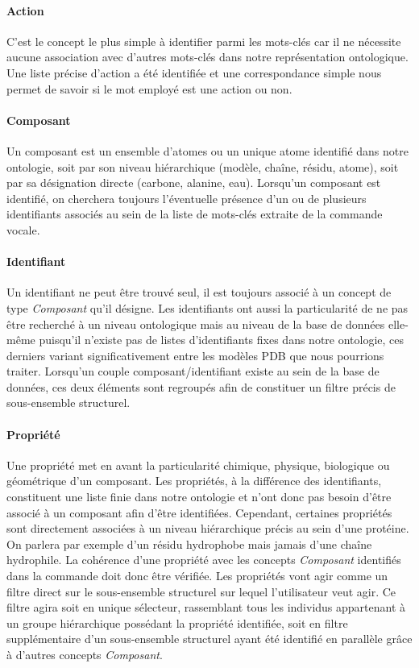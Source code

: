 \paragraph{Action}

C'est le concept le plus simple à identifier parmi les mots-clés car il ne nécessite aucune association avec d'autres mots-clés dans notre représentation ontologique. Une liste précise d'action a été identifiée et une correspondance simple nous permet de savoir si le mot employé est une action ou non.

\paragraph{Composant}

Un composant est un ensemble d'atomes ou un unique atome identifié dans notre ontologie, soit par son niveau hiérarchique (modèle, chaîne, résidu, atome), soit par sa désignation directe (carbone, alanine, eau). Lorsqu'un composant est identifié, on cherchera toujours l'éventuelle présence d'un ou de plusieurs identifiants associés au sein de la liste de mots-clés extraite de la commande vocale.

\paragraph{Identifiant}

Un identifiant ne peut être trouvé seul, il est toujours associé à un concept de type \textit{Composant} qu'il désigne. Les identifiants ont aussi la particularité de ne pas être recherché à un niveau ontologique mais au niveau de la base de données elle-même puisqu'il n'existe pas de listes d'identifiants fixes dans notre ontologie, ces derniers variant significativement entre les modèles PDB que nous pourrions traiter. Lorsqu'un couple composant/identifiant existe au sein de la base de données, ces deux éléments sont regroupés afin de constituer un filtre précis de sous-ensemble structurel.

\paragraph{Propriété}

Une propriété met en avant la particularité chimique, physique, biologique ou géométrique d'un composant. Les propriétés, à la différence des identifiants, constituent une liste finie dans notre ontologie et n'ont donc pas besoin d'être associé à un composant afin d'être identifiées. Cependant, certaines propriétés sont directement associées à un niveau hiérarchique précis au sein d'une protéine. On parlera par exemple d'un résidu hydrophobe mais jamais d'une chaîne hydrophile. La cohérence d'une propriété avec les concepts \textit{Composant} identifiés dans la commande doit donc être vérifiée. 
Les propriétés vont agir comme un filtre direct sur le sous-ensemble structurel sur lequel l'utilisateur veut agir. Ce filtre agira soit en unique sélecteur, rassemblant tous les individus appartenant à un groupe hiérarchique possédant la propriété identifiée, soit en filtre supplémentaire d'un sous-ensemble structurel ayant été identifié en parallèle grâce à d'autres concepts \textit{Composant}.

